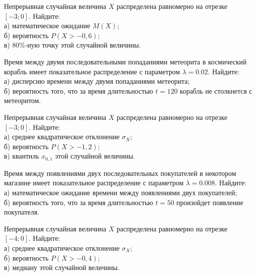 \vfill

\newpage\setcounter{zad}{0}

\z Непрерывная случайная величина $X$ распределена равномерно на отрезке $[-3; 0]$. Найдите: \\ \quad а) математическое ожидание $M(X)$; \\ \quad б) вероятность $P(X>-0{,}6)$; \\ \quad в) $80\%$-ную точку этой случайной величины.


\vfill

\z Время между двумя последовательными попаданиями метеорита в космический корабль имеет показательное распределение с параметром $\lambda = 0.02$. Найдите: \\ \quad а) дисперсию времени между двумя попаданиями метеорита; \\ \quad б) вероятность того, что за время длительностью $t = 120$ корабль не столкнется с метеоритом.
 

\vfill

\newpage\setcounter{zad}{0}

\z Непрерывная случайная величина $X$ распределена равномерно на отрезке $[-3; 0]$. Найдите: \\ \quad а) среднее квадратическое отклонение $\sigma_X$; \\ \quad б) вероятность $P(X>-1{,}2)$; \\ \quad в) квантиль $x_{0{,}1}$ этой случайной величины.


\vfill

\z Время между появлениями двух последовательных покупателей в некотором магазине имеет показательное распределение с параметром $\lambda = 0.008$. Найдите: \\ \quad а) математическое ожидание времени между появлениями двух покупателей; \\ \quad б) вероятность того, что за время длительностью $t = 50$  произойдет появление покупателя.
 

\vfill

\newpage\setcounter{zad}{0}

\z Непрерывная случайная величина $X$ распределена равномерно на отрезке $[-4; 0]$. Найдите: \\ \quad а) среднее квадратическое отклонение $\sigma_X$; \\ \quad б) вероятность $P(X>-0{,}4)$; \\ \quad в) медиану этой случайной величины.


\vfill

